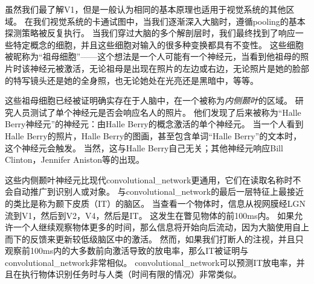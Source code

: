 虽然我们最了解V1，但是一般认为相同的基本原理也适用于视觉系统的其他区域。
在我们视觉系统的卡通试图中，当我们逐渐深入大脑时，遵循\gls{pooling}的基本探测策略被反复执行。
当我们穿过大脑的多个解剖层时，我们最终找到了响应一些特定概念的细胞，并且这些细胞对输入的很多种变换都具有不变性。
这些细胞被昵称为``祖母细胞''——这个想法是一个人可能有一个神经元，当看到他祖母的照片时该神经元被激活，无论祖母是出现在照片的左边或右边，无论照片是她的脸部的特写镜头还是她的全身照，也无论她处在光亮还是黑暗中，等等。

这些祖母细胞已经被证明确实存在于人脑中，在一个被称为\emph{内侧颞叶}的区域\citep{quiroga2005invariant}。
研究人员测试了单个神经元是否会响应名人的照片。
他们发现了后来被称为``Halle Berry神经元''的神经元：由Halle Berry的概念激活的单个神经元。
当一个人看到Halle Berry的照片，Halle Berry的图画，甚至包含单词``Halle Berry''的文本时，这个神经元会触发。
当然，这与Halle Berry自己无关；其他神经元响应Bill Clinton，Jennifer Aniston等的出现。
 
 
这些内侧颞叶神经元比现代\gls{convolutional_network}更通用，它们在读取名称时不会自动推广到识别人或对象。
与\gls{convolutional_network}的最后一层特征上最接近的类比是称为颞下皮质（IT）的脑区。
当查看一个物体时，信息从视网膜经LGN流到V1，然后到V2，V4，然后是IT。
这发生在瞥见物体的前100ms内。
如果允许一个人继续观察物体更多的时间，那么信息将开始向后流动，因为大脑使用自上而下的反馈来更新较低级脑区中的激活。
然而，如果我们打断人的注视，并且只观察前100ms内的大多数前向激活导致的放电率，那么IT被证明与\gls{convolutional_network}非常相似。
\gls{convolutional_network}可以预测IT放电率，并且在执行物体识别任务时与人类（时间有限的情况）非常类似\citep{dicarlo-tutorial-2013}。


